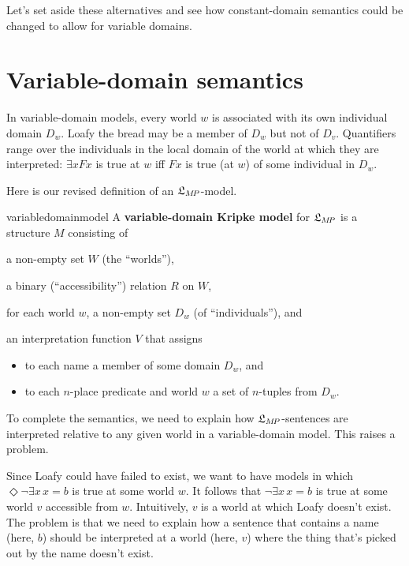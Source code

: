 Let's set aside these alternatives and see how constant-domain semantics could
be changed to allow for variable domains.

\section{Variable-domain semantics}\label{sec:variabledomains}

In variable-domain models, every world $w$ is associated with its own individual
domain $D_w$. Loafy the bread may be a member of $D_w$ but not of $D_v$.
Quantifiers range over the individuals in the local domain of the world at which
they are interpreted: $\exists x Fx$ is true at $w$ iff $Fx$ is true (at $w$) of
some individual in $D_w$.

Here is our revised definition of an $\mathfrak{L}_{M\!P}$-model.

\begin{definition}{}{variabledomainmodel}
  A \textbf{variable-domain Kripke model} for $\mathfrak{L}_{M\!P}$ is a structure $M$
  consisting of%
  \medskip
  \begin{compactenum}
  \item a non-empty set $W$ (the ``worlds''),
  \item a binary (``accessibility'') relation $R$ on $W$,
  \item for each world $w$, a non-empty set $D_w$ (of ``individuals''), and
  \item an interpretation function $V$ that assigns
    \vspace{-1mm}
    \begin{itemize}
      \itemsep-1mm
      \item to each name a member of some domain $D_w$, and
      \item to each $n$-place predicate and world $w$ a set of $n$-tuples from
            $D_w$.
    \end{itemize}
  \end{compactenum}
\end{definition}

To complete the semantics, we need to explain how $\mathfrak{L}_{M\!P}$-sentences are
interpreted relative to any given world in a variable-domain model. This raises
a problem.

Since Loafy could have failed to exist, we want to have models in which
$\Diamond \neg \exists x\, {x\!=\!b}$ is true at some world $w$. It follows that
$\neg \exists x\, x\!=\!b$ is true at some world $v$ accessible from $w$.
Intuitively, $v$ is a world at which Loafy doesn't exist. The problem is that we
need to explain how a sentence that contains a name (here, $b$) should be
interpreted at a world (here, $v$) where the thing that's picked out by the name
doesn't exist.

